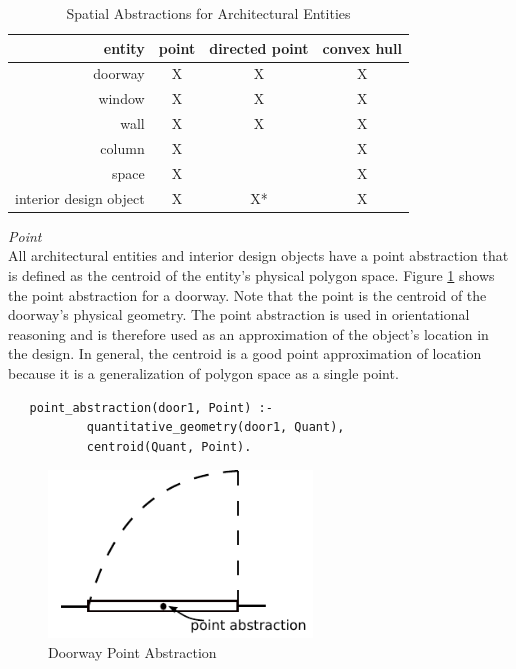 \documentclass[12pt]{ucthesis}
\begin{document}
\begin{table}[H]
  \begin{center}
  \begin{tabular}{ | r | c | c | c |}
    \hline
    entity & point & directed point & convex hull\\ \hline
    doorway & X & X & X \\ \hline
    window & X & X & X \\ \hline
    wall & X & X & X \\ \hline
    column & X &  & X \\ \hline
    space & X &  & X \\ \hline
    interior design object & X & X* & X \\
    \hline
  \end{tabular}
  \end{center}
\caption{Spatial Abstractions for Architectural Entities}
\label{spatial abstractions}
\end{table} 

\noindent \emph{\large Point} \\
\indent All architectural entities and interior design objects have a point abstraction that is defined as the centroid of the entity's physical polygon space. Figure \ref{point-abs} shows the point abstraction for a doorway. Note that the point is the centroid of the doorway's physical geometry. The point abstraction is used in orientational reasoning and is therefore used as an approximation of the object's location in the design. In general, the centroid is a good point approximation of location because it is a generalization of polygon space as a single point. 
\begin{verbatim}
   point_abstraction(door1, Point) :-
           quantitative_geometry(door1, Quant),
           centroid(Quant, Point).
\end{verbatim}

\begin{figure}[H]
\centering
\includegraphics[width=70mm]{point-abs}
\caption{Doorway Point Abstraction}
\label{point-abs}
\end{figure}
\end{document}
